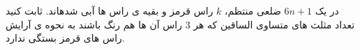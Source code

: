 \exercise
در یک
$6n + 1$
ضلعی منتظم،
$k$
راس قرمز و بقیه ی راس ها آبی شدهاند. ثابت کنید تعداد مثلث های متساوی الساقین که هر
$3$
راس آن ها هم رنگ باشند به نحوه ی آرایش راس های قرمز بستگی ندارد.